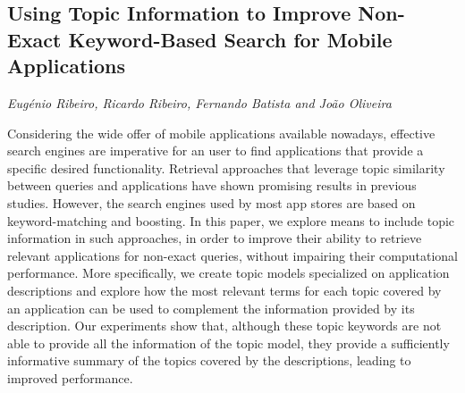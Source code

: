 \documentclass[../booklet.tex]{subfiles}
\begin{document}
\subsection[Using Topic Information to Improve Non-Exact Keyword-Based Search for Mobile Applications. {\it Eugénio Ribeiro, Ricardo Ribeiro, Fernando Batista and João Oliveira}]{Using Topic Information to Improve Non-Exact Keyword-Based Search for Mobile Applications}
   

\begin{center}
  {\it Eugénio Ribeiro, Ricardo Ribeiro, Fernando Batista and João Oliveira}
\end{center}



Considering the wide offer of mobile applications available nowadays, effective search engines are imperative for an user to find applications that provide a specific desired functionality. Retrieval approaches that leverage topic similarity between queries and applications have shown promising results in previous studies. However, the search engines used by most app stores are based on keyword-matching and boosting. In this paper, we explore means to include topic information in such approaches, in order to improve their ability to retrieve relevant applications for non-exact queries, without impairing their computational performance. More specifically, we create topic models specialized on application descriptions and explore how the most relevant terms for each topic covered by an application can be used to complement the information provided by its description. Our experiments show that, although these topic keywords are not able to provide all the information of the topic model, they provide a sufficiently informative summary of the topics covered by the descriptions, leading to improved performance.

\end{document}
